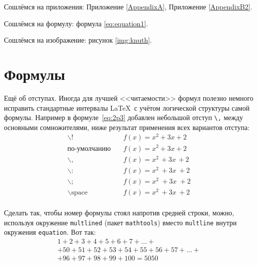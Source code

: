 Сошлёмся на приложения: Приложение \ref{AppendixA}, Приложение \ref{AppendixB2}.

Сошлёмся на формулу: формула \eqref{eq:equation1}.

Сошлёмся на изображение: рисунок \ref{img:knuth}.


\section{Формулы} \label{sect1_3}


Ещё об отступах. Иногда для лучшей <<читаемости>> формул полезно
немного исправить стандартные интервалы \LaTeX\ с учётом логической
структуры самой формулы. Например в формуле~\ref{eq:2p3} добавлен
небольшой отступ \verb+\,+ между основными сомножителями, ниже
результат применения всех вариантов отступа:
\begin{align*}
\backslash! &\quad f(x) = x^2\! +3x\! +2 \\
  \mbox{по-умолчанию} &\quad f(x) = x^2+3x+2 \\
\backslash, &\quad f(x) = x^2\, +3x\, +2 \\
\backslash{:} &\quad f(x) = x^2\: +3x\: +2 \\
\backslash; &\quad f(x) = x^2\; +3x\; +2 \\
\backslash \mbox{space} &\quad f(x) = x^2\ +3x\ +2 \\
\end{align*}


Сделать так, чтобы номер формулы стоял напротив средней строки, можно, используя окружение \verb|multlined| (пакет \verb|mathtools|) вместо \verb|multline| внутри окружения \verb|equation|. Вот так:
\begin{equation} %
  \label{eq:equation3}
    \begin{multlined}
        1+ 2+3+4+5+6+7+\dots + \\ 
        + 50+51+52+53+54+55+56+57 + \dots + \\ 
        + 96+97+98+99+100=5050 
    \end{multlined}
\end{equation}


